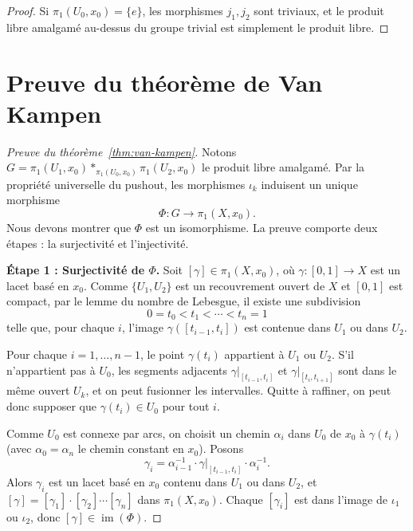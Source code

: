 \documentclass[12pt,a4paper,openany]{book}
\theoremstyle{definition}
\theoremstyle{plain}
\theoremstyle{remark}
\DeclareMathOperator{\im}{im}
\begin{document}
\begin{proof}
Si $\pi_1(U_0, x_0) = \{e\}$, les morphismes $j_1, j_2$ sont triviaux,
et le produit libre amalgamé au-dessus du groupe trivial est simplement le produit libre.
\end{proof}

\section{Preuve du théorème de Van Kampen}\label{sec:preuve-vk}

\begin{proof}[Preuve du théorème~\ref{thm:van-kampen}]
Notons $G = \pi_1(U_1, x_0) *_{\pi_1(U_0, x_0)} \pi_1(U_2, x_0)$ le produit libre amalgamé.
Par la propriété universelle du pushout, les morphismes $\iota_k$ induisent un unique morphisme
\[
\Phi \colon G \longrightarrow \pi_1(X, x_0).
\]
Nous devons montrer que $\Phi$ est un isomorphisme. La preuve comporte deux étapes :
la surjectivité et l'injectivité.

\medskip
\textbf{Étape 1 : Surjectivité de $\Phi$.}
Soit $[\gamma] \in \pi_1(X, x_0)$, où $\gamma \colon [0,1] \to X$ est un lacet basé en $x_0$.
Comme $\{U_1, U_2\}$ est un recouvrement ouvert de $X$ et $[0,1]$ est compact, par le
lemme du nombre de Lebesgue, il existe une subdivision
\[
0 = t_0 < t_1 < \cdots < t_n = 1
\]
telle que, pour chaque $i$, l'image $\gamma([t_{i-1}, t_i])$ est contenue dans $U_1$ ou dans $U_2$.

Pour chaque $i = 1, \ldots, n-1$, le point $\gamma(t_i)$ appartient à $U_1$ ou $U_2$.
S'il n'appartient pas à $U_0$, les segments adjacents $\gamma|_{[t_{i-1},t_i]}$ et
$\gamma|_{[t_i, t_{i+1}]}$ sont dans le même ouvert $U_k$, et on peut fusionner les
intervalles. Quitte à raffiner, on peut donc supposer que $\gamma(t_i) \in U_0$ pour tout $i$.

Comme $U_0$ est connexe par arcs, on choisit un chemin $\alpha_i$ dans $U_0$
de $x_0$ à $\gamma(t_i)$ (avec $\alpha_0 = \alpha_n$ le chemin constant en $x_0$).
Posons
\[
\gamma_i = \alpha_{i-1}^{-1} \cdot \gamma|_{[t_{i-1}, t_i]} \cdot \alpha_i^{-1}.
\]
Alors $\gamma_i$ est un lacet basé en $x_0$ contenu dans $U_1$ ou dans $U_2$, et
$[\gamma] = [\gamma_1] \cdot [\gamma_2] \cdots [\gamma_n]$ dans $\pi_1(X, x_0)$.
Chaque $[\gamma_i]$ est dans l'image de $\iota_1$ ou $\iota_2$, donc
$[\gamma] \in \im(\Phi)$.


\end{proof}
\end{document}
